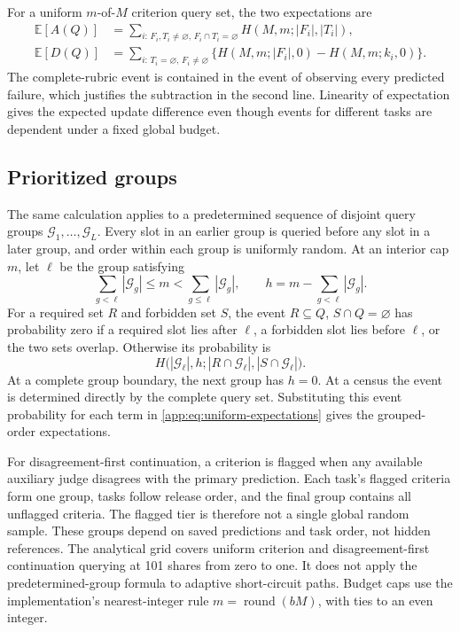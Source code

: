 For a uniform $m$-of-$M$ criterion query set, the two expectations are
\begin{align}
 \mathbb E[A(Q)]
 &=\sum_{i:\,F_i,T_i\ne\varnothing,\,F_i\cap T_i=\varnothing}
     H(M,m;|F_i|,|T_i|),\\
 \mathbb E[D(Q)]
 &=\sum_{i:\,T_i=\varnothing,\,F_i\ne\varnothing}
     \{H(M,m;|F_i|,0)-H(M,m;k_i,0)\}.
 \label{app:eq:uniform-expectations}
\end{align}
The complete-rubric event is contained in the event of observing every
predicted failure, which justifies the subtraction in the second line.
Linearity of expectation gives the expected update difference even though
events for different tasks are dependent under a fixed global budget.

\subsection{Prioritized groups}
\label{app:priority-groups}

The same calculation applies to a predetermined sequence of disjoint query
groups $\mathcal G_1,\ldots,\mathcal G_L$. Every slot in an earlier group is
queried before any slot in a later group, and order within each group is
uniformly random. At an interior cap $m$, let $\ell$ be the group satisfying
\[
 \sum_{g<\ell}|\mathcal G_g|\leq m
 <\sum_{g\leq\ell}|\mathcal G_g|,
 \qquad h=m-\sum_{g<\ell}|\mathcal G_g|.
\]
For a required set $R$ and forbidden set $S$, the event
$R\subseteq Q$, $S\cap Q=\varnothing$ has probability zero if a required
slot lies after $\ell$, a forbidden slot lies before $\ell$, or the two sets
overlap. Otherwise its probability is
\begin{equation}
 H\bigl(|\mathcal G_\ell|,h;
         |R\cap\mathcal G_\ell|,|S\cap\mathcal G_\ell|\bigr).
 \label{app:eq:group-event}
\end{equation}
At a complete group boundary, the next group has $h=0$. At a census the
event is determined directly by the complete query set. Substituting this
event probability for each term in
\eqref{app:eq:uniform-expectations} gives the grouped-order expectations.

For disagreement-first continuation, a criterion is flagged when any available
auxiliary judge disagrees with the primary prediction. Each task's flagged
criteria form one group, tasks follow release order, and the final group
contains all unflagged criteria. The flagged tier is therefore not a single
global random sample. These groups depend on saved predictions and task
order, not hidden references. The analytical grid covers uniform criterion
and disagreement-first continuation querying at 101 shares from zero to one. It
does not apply the predetermined-group formula to adaptive short-circuit
paths. Budget caps use the implementation's nearest-integer rule
$m=\operatorname{round}(bM)$, with ties to an even integer.

